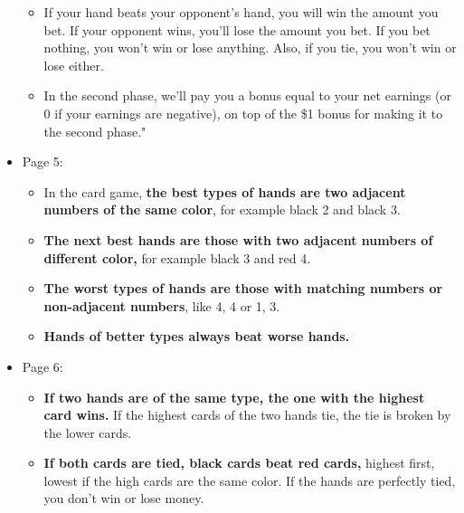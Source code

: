 \begin{itemize}
\begin{itemize}
    \item If your hand beats your opponent's hand, you will win the amount you bet. If your opponent wins, you'll lose the amount you bet. If you bet nothing, you won't win or lose anything. Also, if you tie, you won't win or lose either.
    \item In the second phase, we'll pay you a bonus equal to your net earnings (or 0 if your earnings are negative), on top of the \$1 bonus for making it to the second phase."
    \end{itemize}
\item  Page 5:
    \begin{itemize}
    \item In the card game, \textbf{the best types of hands are two adjacent numbers of the same color}, for example black 2 and black 3.
    \item \textbf{The next best hands are those with two adjacent numbers of different color,} for example black 3 and red 4.
    \item \textbf{The worst types of hands are those with matching numbers or non-adjacent numbers}, like 4, 4 or 1, 3.
    \item \textbf{Hands of better types always beat worse hands.}
    \end{itemize}
\item  Page 6:
    \begin{itemize}
    \item \textbf{If two hands are of the same type, the one with the highest card wins.} If the highest cards of the two hands tie, the tie is broken by the lower cards.
    \item \textbf{If both cards are tied, black cards beat red cards,} highest first, lowest if the high cards are the same color. If the hands are perfectly tied, you don't win or lose money.
    \end{itemize}
\end{itemize}

